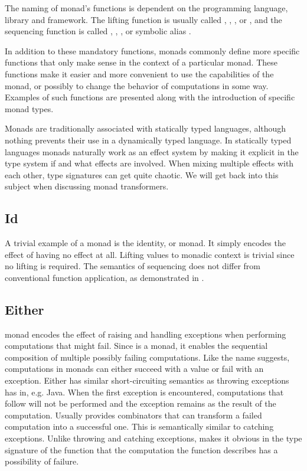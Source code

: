 

The naming of monad's functions is dependent on the programming language, library and framework. The lifting function is usually called , , , or , and the sequencing function is called , , , or symbolic alias \inlinecode{>>=}.

In addition to these mandatory functions, monads commonly define more specific functions that only make sense in the context of a particular monad. These functions make it easier and more convenient to use the capabilities of the monad, or possibly to change the behavior of computations in some way. Examples of such functions are presented along with the introduction of specific monad types.

Monads are traditionally associated with statically typed languages, although nothing prevents their use in a dynamically typed language. In statically typed languages monads naturally work as an effect system by making it explicit in the type system if and what effects are involved. When mixing multiple effects with each other, type signatures can get quite chaotic. We will get back into this subject when discussing monad transformers.


\subsection{Id}
A trivial example of a monad is the identity, or  monad. It simply encodes the effect of having no effect at all. Lifting values to monadic context is trivial since no lifting is required. The semantics of sequencing does not differ from conventional function application, as demonstrated in .




\subsection{Either} \label{monads:either}
 monad encodes the effect of raising and handling exceptions when performing computations that might fail. Since  is a monad, it enables the sequential composition of multiple possibly failing computations. Like the name suggests, computations in  monads can either succeed with a value or fail with an exception. Either has similar short-circuiting semantics as throwing exceptions has in, e.g. Java. When the first exception is encountered, computations that follow will not be performed and the exception remains as the result of the computation. Usually  provides combinators that can transform a failed computation into a successful one. This is semantically similar to catching exceptions. Unlike throwing and catching exceptions,  makes it obvious in the type signature of the function that the computation the function describes has a possibility of failure.

